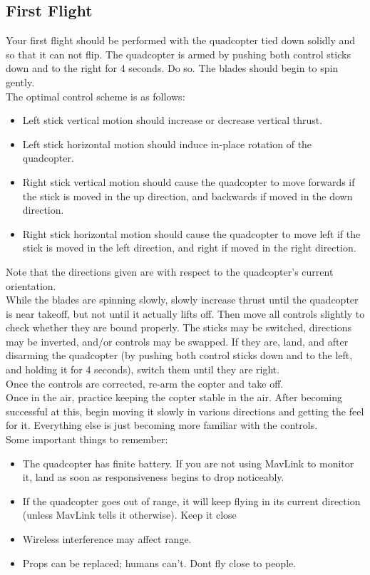 \subsection{First Flight}
Your first flight should be performed with the quadcopter tied down solidly and so that it can not flip. The quadcopter is armed by pushing both control sticks down and to the right for 4 seconds. Do so. The blades should begin to spin gently.\\
\indent The optimal control scheme is as follows:
\begin{itemize}
\item Left stick vertical motion should increase or decrease vertical thrust.\\
\item Left stick horizontal motion should induce in-place rotation of the quadcopter.\\
\item Right stick vertical motion should cause the quadcopter to move forwards if the stick is moved in the up direction, and backwards if moved in the down direction.\\
\item Right stick horizontal motion should cause the quadcopter to move left if the stick is moved in the left direction, and right if moved in the right direction.\\
\end{itemize}
Note that the directions given are with respect to the quadcopter's current orientation.\\
\indent While the blades are spinning slowly, slowly increase thrust until the quadcopter is near takeoff, but not until it actually lifts off. Then move all controls slightly to check whether they are bound properly. The sticks may be switched, directions may be inverted, and/or controls may be swapped. If they are, land, and after disarming the quadcopter (by pushing both control sticks down and to the left, and holding it for 4 seconds), switch them until they are right.\\
\indent Once the controls are corrected, re-arm the copter and take off.\\
\indent Once in the air, practice keeping the copter stable in the air. After becoming successful at this, begin moving it slowly in various directions and getting the feel for it. Everything else is just becoming more familiar with the controls.\\
Some important things to remember:
\begin{itemize}
	\item The quadcopter has finite battery. If you are not using MavLink to monitor it, land as soon as responsiveness begins to drop noticeably.
	\item If the quadcopter goes out of range, it will keep flying in its current direction (unless MavLink tells it otherwise). Keep it close
	\item Wireless interference may affect range.
	\item Props can be replaced; humans can't. Dont fly close to people.
\end{itemize}